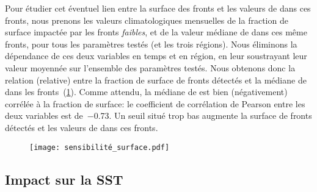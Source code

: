 Pour étudier cet éventuel lien entre la surface des fronts et les valeurs de  dans ces fronts, nous prenons les valeurs climatologiques mensuelles de la fraction de surface impactée par les fronts \emph{faibles}, et de la valeur médiane de  dans ces même fronts, pour tous les paramètres testés (et les trois régions).
Nous éliminons la dépendance de ces deux variables en temps et en région, en leur soustrayant leur valeur moyennée sur l'ensemble des paramètres testés.
Nous obtenons donc la relation (relative) entre la fraction de surface de fronts détectés et la médiane de  dans les fronts~(\cref{fig:sensibilite-surface}).
Comme attendu, la médiane de  est bien (négativement) corrélée à la fraction de surface: le coefficient de corrélation de Pearson entre les deux variables est de~\num{-0.73}.
Un seuil situé trop bas augmente la surface de fronts détectés et  les valeurs de  dans ces fronts.

\begin{figure}
  \centering
  \texttt{[image: sensibilité\_surface.pdf]}
  \label{fig:sensibilite-surface}
\end{figure}


\subsection{Impact sur la SST}
\label{sec:res-sst}
